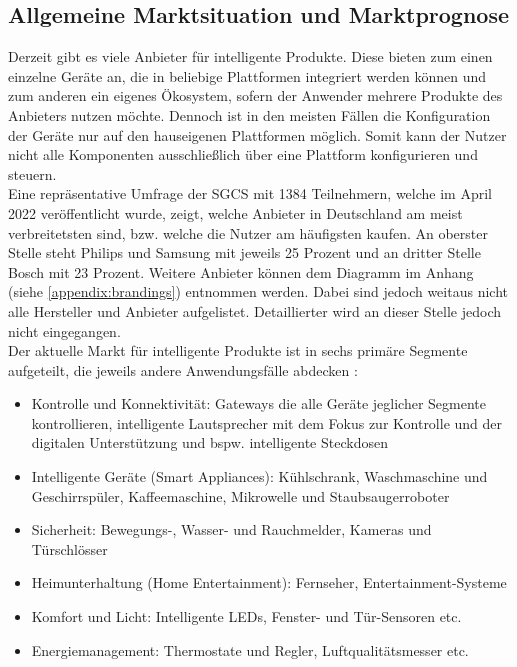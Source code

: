     \subsection{Allgemeine Marktsituation und Marktprognose}
        Derzeit gibt es viele Anbieter für intelligente Produkte. Diese bieten zum einen einzelne Geräte an, die in 
        beliebige Plattformen integriert werden können und zum anderen ein eigenes Ökosystem, sofern der Anwender 
        mehrere Produkte des Anbieters nutzen möchte. Dennoch ist in den meisten Fällen die Konfiguration der Geräte nur auf 
        den hauseigenen Plattformen möglich. Somit kann der Nutzer nicht alle Komponenten ausschließlich über eine Plattform 
        konfigurieren und steuern. 
        \\
        \linebreak
        Eine repräsentative Umfrage der \ac{SGCS} mit 1384 Teilnehmern, welche im April 2022 veröffentlicht wurde, zeigt, welche 
        Anbieter in Deutschland am meist verbreitetsten sind, bzw. welche die Nutzer am häufigsten kaufen. An oberster Stelle 
        steht Philips und Samsung mit jeweils 25 Prozent und an dritter Stelle Bosch mit 23 Prozent. Weitere Anbieter können dem 
        Diagramm im Anhang (siehe \ref{appendix:brandings}) entnommen werden. Dabei sind jedoch weitaus nicht alle Hersteller und 
        Anbieter aufgelistet. Detaillierter wird an dieser Stelle jedoch nicht eingegangen. 
        \\
        \linebreak
        Der aktuelle Markt für intelligente Produkte ist in sechs primäre Segmente aufgeteilt, die jeweils andere Anwendungsfälle 
        abdecken \cite{statista2021}:
        \begin{itemize}
            \item Kontrolle und Konnektivität: Gateways die alle Geräte jeglicher Segmente kontrollieren, intelligente Lautsprecher 
            mit dem Fokus zur Kontrolle und der digitalen Unterstützung und bspw. intelligente Steckdosen
            \item Intelligente Geräte (Smart Appliances): Kühlschrank, Waschmaschine und Geschirrspüler, Kaffeemaschine, Mikrowelle 
            und Staubsaugerroboter
            \item Sicherheit: Bewegungs-, Wasser- und Rauchmelder, Kameras und Türschlösser
            \item Heimunterhaltung (Home Entertainment): Fernseher, Entertainment-Systeme 
            \item Komfort und Licht: Intelligente LEDs, Fenster- und Tür-Sensoren etc.
            \item Energiemanagement: Thermostate und Regler, Luftqualitätsmesser etc. 
        \end{itemize}
